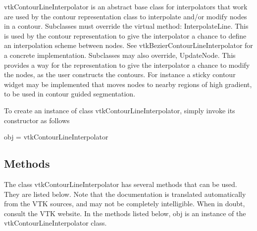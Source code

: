 vtk\-Contour\-Line\-Interpolator is an abstract base class for interpolators that work are used by the contour representation class to interpolate and/or modify nodes in a contour. Subclasses must override the virtual method\-: {\ttfamily Interpolate\-Line}. This is used by the contour representation to give the interpolator a chance to define an interpolation scheme between nodes. See vtk\-Bezier\-Contour\-Line\-Interpolator for a concrete implementation. Subclasses may also override, {\ttfamily Update\-Node}. This provides a way for the representation to give the interpolator a chance to modify the nodes, as the user constructs the contours. For instance a sticky contour widget may be implemented that moves nodes to nearby regions of high gradient, to be used in contour guided segmentation.

To create an instance of class vtk\-Contour\-Line\-Interpolator, simply invoke its constructor as follows \begin{DoxyVerb}  obj = vtkContourLineInterpolator
\end{DoxyVerb}
 \hypertarget{vtkwidgets_vtkxyplotwidget_Methods}{}\subsection{Methods}\label{vtkwidgets_vtkxyplotwidget_Methods}
The class vtk\-Contour\-Line\-Interpolator has several methods that can be used. They are listed below. Note that the documentation is translated automatically from the V\-T\-K sources, and may not be completely intelligible. When in doubt, consult the V\-T\-K website. In the methods listed below, {\ttfamily obj} is an instance of the vtk\-Contour\-Line\-Interpolator class. 
